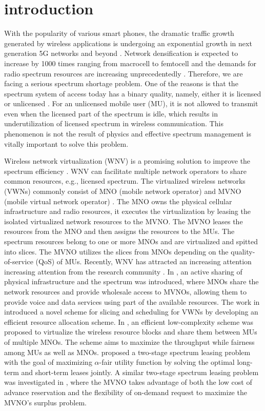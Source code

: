 \documentclass[journal]{IEEEtran}
\begin{document}
\section{introduction}
With the popularity of various smart phones, the dramatic traffic growth generated by wireless applications is undergoing an exponential growth in next generation 5G networks and beyond \cite{NPanwar,NAlFalahy}. Network densification is expected to increase by 1000 times ranging from macrocell to femtocell and the demands for radio spectrum resources are increasing unprecedentedly \cite{AYDing}. Therefore, we are facing a serious spectrum shortage problem. One of the reasons is that the spectrum system of access today has a binary quality, namely, either it is licensed or unlicensed \cite{JRosenworcel}. For an unlicensed mobile user (MU), it is not allowed to transmit even when the licensed part of the spectrum is idle, which results in underutilization of licensed spectrum in wireless communication. This phenomenon is not the result of physics and effective spectrum management is vitally important to solve this problem.

Wireless network virtualization (WNV) is a promising solution to improve the spectrum efficiency \cite{CLiang,LZhao,3GPP}. WNV can facilitate multiple network operators to share common resources, e.g., licensed spectrum. The virtualized wireless networks (VWNs) commonly consist of MNO (mobile network operator) and MVNO (mobile virtual network operator) \cite{RKokku}. The MNO owns the physical cellular infrastructure and radio resources, it executes the virtualization by leasing the isolated virtualized network resources to the MVNO. The MVNO leases the resources from the MNO and then assigns the resources to the MUs. The spectrum resources belong to one or more MNOs and are virtualized and spitted into slices. The MVNO utilizes the slices from MNOs depending on the quality-of-service (QoS) of MUs. Recently, WNV has attracted an increasing attention increasing attention from the research community \cite{XCostaPerez,MIKamel,MKalil,YXZhang1,YXZhang2}. In \cite{XCostaPerez}, an active sharing of physical infrastructure and the spectrum was introduced, where MNOs share the network resources and provide wholesale access to MVNOs, allowing them to provide voice and data services using part of the available resources. The work in \cite{MIKamel} introduced a novel scheme for slicing and scheduling for VWNs by developing an efficient resource allocation scheme. In \cite{MKalil}, an efficient low-complexity
scheme was proposed to virtualize the wireless resource blocks and
share them between MUs of multiple MNOs. The scheme aims to maximize the throughput
while fairness among MUs as well as MNOs. \cite{YXZhang1} proposed a two-stage spectrum leasing problem with the goal of maximizing $\alpha$-fair utility function by solving the optimal long-term and short-term leases jointly. A similar two-stage spectrum leasing problem was investigated in \cite{YXZhang2}, where the MVNO takes advantage of both the low cost of advance reservation and the flexibility of on-demand request to maximize the MVNO’s surplus problem.
\end{document}
